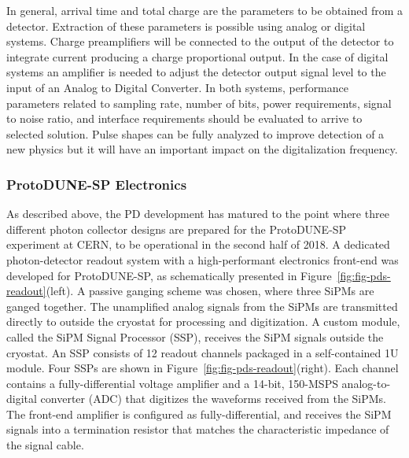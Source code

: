 In general, arrival time and total charge are the parameters to be obtained from a detector. Extraction of these parameters 
is possible using analog or digital systems. Charge preamplifiers will be connected to the output of the detector to integrate 
current producing a charge proportional output. In the case of digital systems an amplifier is needed to adjust the detector output signal 
level to the input of an Analog to Digital Converter.  In both systems, performance parameters related  to sampling rate, number of bits, 
power requirements, signal to noise ratio, and interface requirements should be evaluated to arrive to selected solution.  
Pulse shapes can be fully analyzed to improve detection of a new physics but it will have an important impact on the digitalization frequency.


\subsubsection{ProtoDUNE-SP Electronics}

As described above, the PD development has matured to the point where three different photon collector designs are 
prepared for the ProtoDUNE-SP experiment at CERN, to be operational in the second half of \num{2018}. 
A dedicated photon-detector readout system with a high-performant electronics front-end was developed for ProtoDUNE-SP, 
as schematically presented in Figure~\ref{fig:fig-pds-readout}(left). A passive ganging scheme was chosen, where three SiPMs are ganged together.  
The unamplified analog signals from the SiPMs are transmitted directly to outside the cryostat for processing and digitization. A custom module, 
called the SiPM Signal Processor (SSP), receives the SiPM signals outside the cryostat. An SSP consists of \num{12} readout channels packaged in 
a self-contained 1U module. Four SSPs are shown in Figure~\ref{fig:fig-pds-readout}(right). Each channel contains a fully-differential voltage 
amplifier and a \num{14}-bit, \num{150}-MSPS analog-to-digital converter (ADC) that digitizes the waveforms received from the SiPMs. The front-end amplifier 
is configured as fully-differential, and receives the SiPM signals into a termination resistor that matches the characteristic impedance of the signal cable. 


